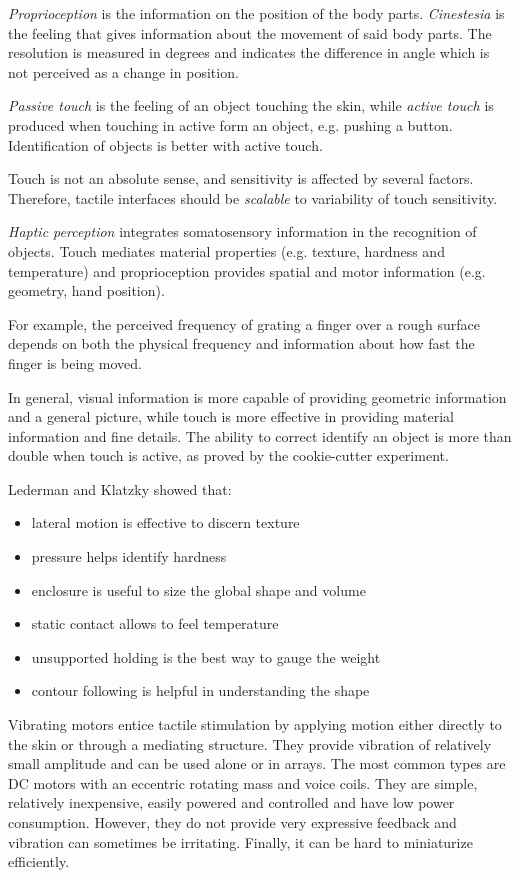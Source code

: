 \documentclass[a4paper]{article}
\begin{document}
\emph{Proprioception} is the information on the position of the body parts.
\emph{Cinestesia} is the feeling that gives information about the movement of said body parts.
The resolution is measured in degrees and indicates the difference in angle which is not perceived as a change in position.

\emph{Passive touch} is the feeling of an object touching the skin, while \emph{active touch} is produced when touching in active form an object, e.g. pushing a button.
Identification of objects is better with active touch.

Touch is not an absolute sense, and sensitivity is affected by several factors.
Therefore, tactile interfaces should be \emph{scalable} to variability of touch sensitivity.

\emph{Haptic perception} integrates somatosensory information in the recognition of objects.
Touch mediates material properties (e.g. texture, hardness and temperature) and proprioception provides spatial and motor information (e.g. geometry, hand position).

For example, the perceived frequency of grating a finger over a rough surface depends on both the physical frequency and information about how fast the finger is being moved.

In general, visual information is more capable of providing geometric information and a general picture, while touch is more effective in providing material information and fine details.
The ability to correct identify an object is more than double when touch is active, as proved by the cookie-cutter experiment.

Lederman and Klatzky showed that:
\begin{itemize}
    \item lateral motion is effective to discern texture
    \item pressure helps identify hardness
    \item enclosure is useful to size the global shape and volume
    \item static contact allows to feel temperature
    \item unsupported holding is the best way to gauge the weight
    \item contour following is helpful in understanding the shape
\end{itemize}

Vibrating motors entice tactile stimulation by applying motion either directly to the skin or through a mediating structure.
They provide vibration of relatively small amplitude and can be used alone or in arrays.
The most common types are DC motors with an eccentric rotating mass and voice coils.
They are simple, relatively inexpensive, easily powered and controlled and have low power consumption.
However, they do not provide very expressive feedback and vibration can sometimes be irritating.
Finally, it can be hard to miniaturize efficiently.
\end{document}
